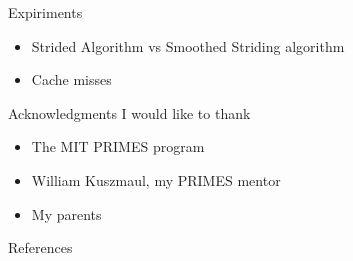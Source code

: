 \documentclass{beamer}
\begin{document}
\begin{frame}[t]{Expiriments}
	\begin{itemize}
		\item Strided Algorithm vs Smoothed Striding algorithm
		\item Cache misses 
	\end{itemize}
\end{frame}

\begin{frame}[t]{Acknowledgments}
I would like to thank
\begin{itemize}
	\item {The MIT PRIMES program}
	\item {William Kuszmaul, my PRIMES mentor}
	\item {My parents}
\end{itemize}
\end{frame}

\begin{frame}[t]{References}
	
	
\end{frame}
\end{document}
